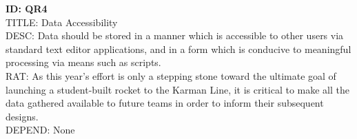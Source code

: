 \documentclass[onecolumn, draftclsnofoot,10pt, compsoc]{IEEEtran}
\begin{document}
			\noindent
			\textbf{ID: QR4}\\
			TITLE: Data Accessibility\\
			DESC: Data should be stored in a manner which is accessible to other users via standard text editor applications, and in a form which is conducive to meaningful processing via means such as scripts.\\
			RAT: As this year's effort is only a stepping stone toward the ultimate goal of launching a student-built rocket to the Karman Line, it is critical to make all the data gathered available to future teams in order to inform their subsequent designs.\\
			DEPEND: None

\end{document}
